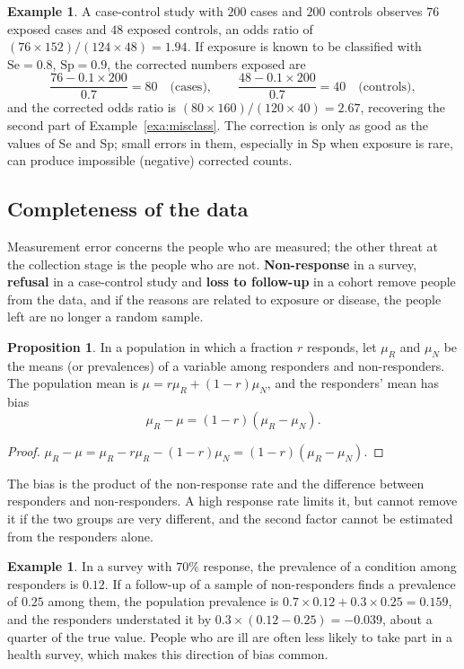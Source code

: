 \documentclass[11pt,a4paper]{article}
\numberwithin{equation}{section}
\theoremstyle{definition}
\newtheorem{exa}[thm]{Example}
\newtheorem{prop}[thm]{Proposition}
\begin{document}
\begin{exa}
A case-control study with $200$ cases and $200$ controls observes $76$ exposed cases and $48$ exposed controls, an odds ratio of
$(76 \times 152)/(124 \times 48) = 1.94$. If exposure is known to be classified with $\text{Se} = 0.8$, $\text{Sp} = 0.9$, the corrected numbers exposed are
\[
\frac{76 - 0.1 \times 200}{0.7} = 80 \quad\text{(cases)}, \qquad \frac{48 - 0.1 \times 200}{0.7} = 40 \quad\text{(controls)},
\]
and the corrected odds ratio is $(80 \times 160)/(120 \times 40) = 2.67$, recovering the second part of Example~\ref{exa:misclass}. The correction
is only as good as the values of Se and Sp; small errors in them, especially in Sp when exposure is rare, can produce impossible
(negative) corrected counts.
\end{exa}

\subsection{Completeness of the data}

Measurement error concerns the people who are measured; the other threat at the collection stage is the people who are not.
\textbf{Non-response} in a survey, \textbf{refusal} in a case-control study and \textbf{loss to follow-up} in a cohort remove people from the
data, and if the reasons are related to exposure or disease, the people left are no longer a random sample.

\begin{prop}
\label{prop:nonresp}
In a population in which a fraction $r$ responds, let $\mu_R$ and $\mu_N$ be the means (or prevalences) of a variable among responders and
non-responders. The population mean is $\mu = r\mu_R + (1 - r)\mu_N$, and the responders' mean has bias
\[
\mu_R - \mu = (1 - r)(\mu_R - \mu_N) .
\]
\end{prop}

\begin{proof}
$\mu_R - \mu = \mu_R - r\mu_R - (1 - r)\mu_N = (1 - r)(\mu_R - \mu_N)$.
\end{proof}

The bias is the product of the non-response rate and the difference between responders and non-responders. A high response rate limits
it, but cannot remove it if the two groups are very different, and the second factor cannot be estimated from the responders alone.

\begin{exa}
In a survey with $70\%$ response, the prevalence of a condition among responders is $0.12$. If a follow-up of a sample of
non-responders finds a prevalence of $0.25$ among them, the population prevalence is $0.7 \times 0.12 + 0.3 \times 0.25 = 0.159$, and the
responders understated it by $0.3 \times (0.12 - 0.25) = -0.039$, about a quarter of the true value. People who are ill are often less likely
to take part in a health survey, which makes this direction of bias common.
\end{exa}
\end{document}
